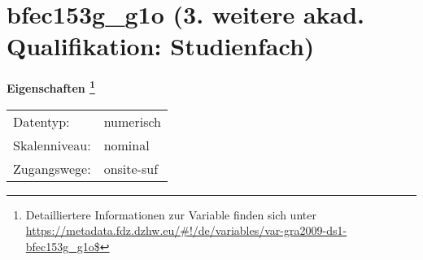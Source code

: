 
    \setcounter{footnote}{0}

    \vspace*{-1.8cm}
	\section{bfec153g\_g1o (3. weitere akad. Qualifikation: Studienfach)}
	\label{section:bfec153g_g1o}



    \vspace*{0.5cm}
    \noindent\textbf{Eigenschaften
	\footnote{Detailliertere Informationen zur Variable finden sich unter
		\url{https://metadata.fdz.dzhw.eu/\#!/de/variables/var-gra2009-ds1-bfec153g_g1o$}}}\\
	\begin{tabularx}{\hsize}{@{}lX}
	Datentyp: & numerisch \\
	Skalenniveau: & nominal \\
	Zugangswege: &
	  onsite-suf
 \\
    \end{tabularx}



